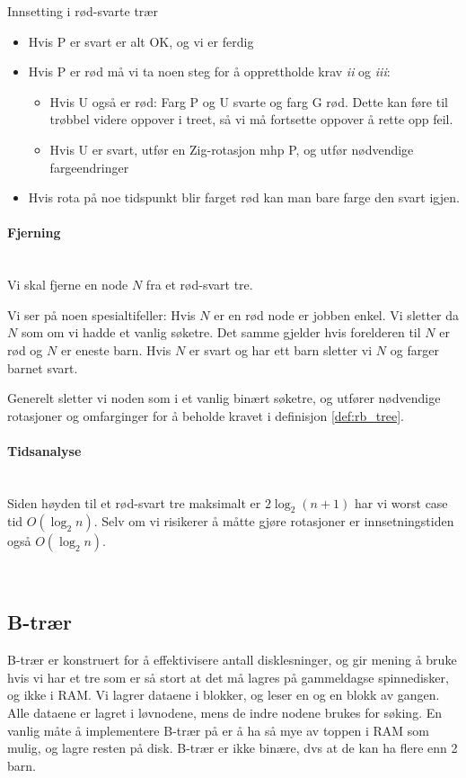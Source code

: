 \begin{theorem} Innsetting i rød-svarte trær
	
	\begin{itemize}
		\item Hvis P er svart er alt OK, og vi er ferdig
		\item Hvis P er rød må vi ta noen steg for å opprettholde krav \textit{ii} og \textit{iii}:
		\begin{itemize}
			\item Hvis U også er rød: Farg P og U svarte og farg G rød. Dette kan føre til trøbbel videre oppover i treet, så vi må fortsette oppover å rette opp feil.
			\item Hvis U er svart, utfør en Zig-rotasjon mhp P, og utfør nødvendige fargeendringer
		\end{itemize}
		\item Hvis rota på noe tidspunkt blir farget rød kan man bare farge den svart igjen.
	\end{itemize}
\end{theorem}


\paragraph{Fjerning}~\\
Vi skal fjerne en node $ N $ fra et rød-svart tre.

Vi ser på noen spesialtifeller: Hvis $ N $ er en rød node er jobben enkel. Vi sletter da $ N $ som om vi hadde et vanlig søketre. Det samme gjelder hvis forelderen til $ N $ er rød og $ N $ er eneste barn. Hvis $ N $ er svart og har ett barn sletter vi $ N $ og farger barnet svart. 

Generelt sletter vi noden som i et vanlig binært søketre, og utfører nødvendige rotasjoner og omfarginger for å beholde kravet i definisjon \ref{def:rb_tree}.


\paragraph{Tidsanalyse}~\\
Siden høyden til et rød-svart tre maksimalt er $ 2\log_2 (n+1) $ har vi worst case tid $ O(\log_2 n) $. Selv om vi risikerer å måtte gjøre rotasjoner er innsetningstiden også $ O(\log_2 n) $.


~\\
\subsection{B-trær} \label{b-tre}
B-trær er konstruert for å effektivisere antall disklesninger, og gir mening å bruke hvis vi har et tre som er så stort at det må lagres på gammeldagse spinnedisker, og ikke i RAM. Vi lagrer dataene i blokker, og leser en og en blokk av gangen. Alle dataene er lagret i løvnodene, mens de indre nodene brukes for søking. En vanlig måte å implementere B-trær på er å ha så mye av toppen i RAM som mulig, og lagre resten på disk. B-trær er ikke binære, dvs at de kan ha flere enn 2 barn. 

